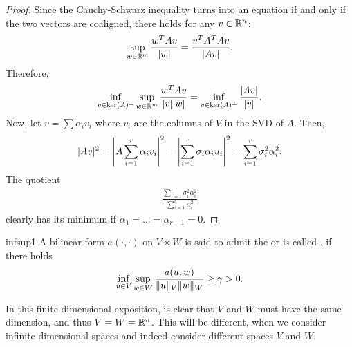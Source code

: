 \begin{proof}
  Since the Cauchy-Schwarz inequality turns into an equation if and
  only if the two vectors are coaligned, there holds for any $v\in \R^n$:
  \begin{gather*}
    \sup_{w\in\R^m}\frac{w^T A v}{\abs{w}} = \frac{v^T A^T A v}{\abs{Av}}.
  \end{gather*}
  Therefore,
  \begin{gather*}
    \inf_{v\in \ker{A}^\perp} \sup_{w\in \R^m}
    \frac{w^T A v}{\abs{v}\abs{w}}
    = \inf_{v\in \ker{A}^\perp} \frac{\abs{Av}}{\abs{v}}.
  \end{gather*}
  Now, let $v = \sum \alpha_i v_i$ where $v_i$ are the columns of $V$
  in the SVD of $A$. Then,
  \begin{gather*}
    \abs{Av}^2 = \abs*{A\sum_{i=1}^r \alpha_i v_i}^2
    = \abs*{\sum_{i=1}^r \sigma_i \alpha_i u_i}^2
    = \sum_{i=1}^r \sigma_i^2 \alpha_i^2.
  \end{gather*}
  The quotient
  \begin{gather*}
    \frac{\sum_{i=1}^r \sigma_i^2 \alpha_i^2}{\sum_{i=1}^r \alpha_i^2}
  \end{gather*}
  clearly has its minimum if $\alpha_1 = \dots=\alpha_{r-1} = 0$.
\end{proof}

\begin{Definition}{infsup1}
  A bilinear form $a(\cdot,\cdot)$ on $V\times W$ is said to admit the
   or is called , if
  there holds
  \begin{gather}
    \label{eq:infsup:1}
    \inf_{u\in V} \sup_{w\in W} \frac{a(u,w)}{\norm{u}_V\norm{w}_W}
    \ge \gamma > 0.
  \end{gather}
\end{Definition}

\begin{remark}
  In this finite dimensional exposition, is clear that $V$ and $W$
  must have the same dimension, and thus $V=W=\R^n$. This will be
  different, when we consider infinite dimensional spaces and indeed
  consider different spaces $V$ and $W$.
\end{remark}

